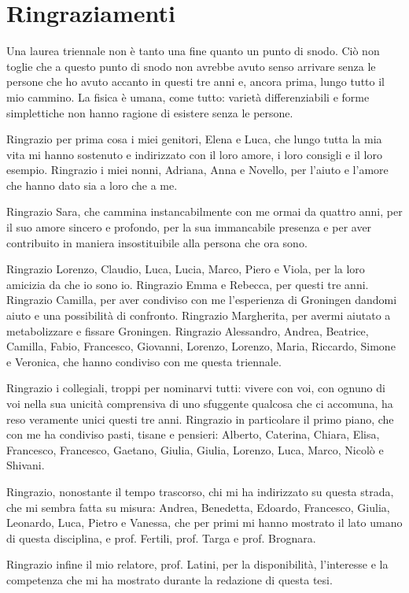 \chapter*{Ringraziamenti} 
Una laurea triennale non è tanto una fine quanto un punto di snodo. Ciò non toglie che a questo punto di snodo non avrebbe avuto senso arrivare senza le persone che ho avuto accanto in questi tre anni e, ancora prima, lungo tutto il mio cammino. La fisica è umana, come tutto: varietà differenziabili e forme simplettiche non hanno ragione di esistere senza le persone.

Ringrazio per prima cosa i miei genitori, Elena e Luca, che lungo tutta la mia vita mi hanno sostenuto e indirizzato con il loro amore, i loro consigli e il loro esempio. Ringrazio i miei nonni, Adriana, Anna e Novello, per l'aiuto e l'amore che hanno dato sia a loro che a me.

Ringrazio Sara, che cammina instancabilmente con me ormai da quattro anni, per il suo amore sincero e profondo, per la sua immancabile presenza e per aver contribuito in maniera insostituibile alla persona che ora sono.

Ringrazio Lorenzo, Claudio, Luca, Lucia, Marco, Piero e Viola, per la loro amicizia da che io sono io. Ringrazio Emma e Rebecca, per questi tre anni. Ringrazio Camilla, per aver condiviso con me l'esperienza di Groningen dandomi aiuto e una possibilità di confronto. Ringrazio Margherita, per avermi aiutato a metabolizzare e fissare Groningen. Ringrazio Alessandro, Andrea, Beatrice, Camilla, Fabio, Francesco, Giovanni, Lorenzo, Lorenzo, Maria, Riccardo, Simone e Veronica, che hanno condiviso con me questa triennale.

Ringrazio i collegiali, troppi per nominarvi tutti: vivere con voi, con ognuno di voi nella sua unicità comprensiva di uno sfuggente qualcosa che ci accomuna, ha reso veramente unici questi tre anni. Ringrazio in particolare il primo piano, che con me ha condiviso pasti, tisane e pensieri: Alberto, Caterina, Chiara, Elisa, Francesco, Francesco, Gaetano, Giulia, Giulia, Lorenzo, Luca, Marco, Nicolò e Shivani.

Ringrazio, nonostante il tempo trascorso, chi mi ha indirizzato su questa strada, che mi sembra fatta su misura: Andrea, Benedetta, Edoardo, Francesco, Giulia, Leonardo, Luca, Pietro e Vanessa, che per primi mi hanno mostrato il lato umano di questa disciplina, e prof. Fertili, prof. Targa e prof. Brognara.

Ringrazio infine il mio relatore, prof. Latini, per la disponibilità, l'interesse e la competenza che mi ha mostrato durante la redazione di questa tesi.